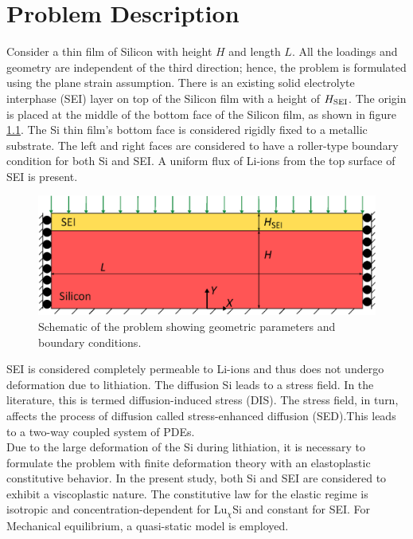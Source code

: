 \chapter{Problem Description}
Consider a thin film of Silicon with height $H$ and length $L$. All the loadings and geometry are independent of the third direction; hence, the problem is formulated using the plane strain assumption. There is an existing solid electrolyte interphase (SEI) layer on top of the Silicon film with a height of $H_{\rm{SEI}}$. The origin is placed at the middle of the bottom face of the Silicon film, as shown in figure \ref{fig:probDesc}. The Si thin film's bottom face is considered rigidly fixed to a metallic substrate. The left and right faces are considered to have a roller-type boundary condition for both Si and SEI. A uniform flux of Li-ions from the top surface of SEI is present. 
\begin{figure}[H]
    \centering
    \includegraphics[width=\textwidth]{figures/probDescFigs/drawing.eps}
    \caption{Schematic of the problem showing geometric parameters and boundary conditions.}
    \label{fig:probDesc}
\end{figure}
SEI is considered completely permeable to Li-ions and thus does not undergo deformation due to lithiation. The diffusion Si leads to a stress field. In the literature, this is termed diffusion-induced stress (DIS). The stress field, in turn, affects the process of diffusion called stress-enhanced diffusion (SED).This leads to a two-way coupled system of PDEs.\\
Due to the large deformation of the Si during lithiation, it is necessary to formulate the problem with finite deformation theory with an elastoplastic constitutive behavior. In the present study, both Si and SEI are considered to exhibit a viscoplastic nature. The constitutive law for the elastic regime is isotropic and concentration-dependent for Lu$_\chi$Si and constant for SEI. 
For Mechanical equilibrium, a quasi-static model is employed.